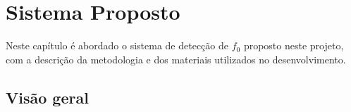 \chapter{Sistema Proposto} \label{cap3}

Neste capítulo é abordado o sistema de detecção de $f_0$ proposto neste projeto, com a descrição da metodologia e dos materiais utilizados no desenvolvimento.

\section{Visão geral}



